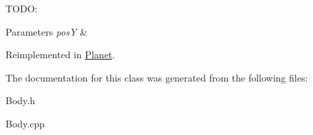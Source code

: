 T\+O\+DO\+: 
\begin{DoxyParams}{Parameters}
{\em posY} & \\
\hline
\end{DoxyParams}


Reimplemented in \hyperlink{class_planet_afb1d37f2f3ce325133604f40ff59c664}{Planet}.



The documentation for this class was generated from the following files\+:\begin{DoxyCompactItemize}
\item 
Body.\+h\item 
Body.\+cpp\end{DoxyCompactItemize}
